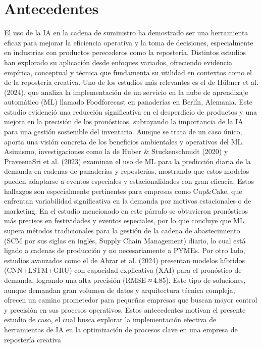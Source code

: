 \documentclass[12pt]{book}
\begin{document}
\chapter{Antecedentes}
El uso de la IA en la cadena de suministro ha demostrado ser una herramienta eficaz para mejorar la eficiencia operativa y la toma de decisiones, especialmente en industrias con productos perecederos como la repostería. Distintos estudios han explorado su aplicación desde enfoques variados, ofreciendo evidencia empírica, conceptual y técnica que fundamenta su utilidad en contextos como el de la repostería creativa.
Uno de los estudios más relevantes es el de Hübner et al. (2024), que analiza la implementación de un servicio en la nube de aprendizaje automático (ML) llamado Foodforecast en panaderías en Berlín, Alemania. 
Este estudio evidenció una reducción significativa en el desperdicio de productos y una mejora en la precisión de los pronósticos, subrayando la importancia de la IA para una gestión sostenible del inventario. Aunque se trata de un caso único, aporta una visión concreta de los beneficios ambientales y operativos del ML.
Asimismo, investigaciones como la de Huber & Stuckenschmidt (2020) y PraveenaSri et al. (2023) examinan el uso de ML para la predicción diaria de la demanda en cadenas de panaderías y reposterías, mostrando que estos modelos pueden adaptarse a eventos especiales y estacionalidades con gran eficacia. Estos hallazgos son especialmente pertinentes para empresas como Cup&Cake, que enfrentan variabilidad significativa en la demanda por motivos estacionales o de marketing. En el estudio mencionado en este párrafo se obtuvieron pronósticos más precisos en festividades y eventos especiales, por lo que concluye que ML supera métodos tradicionales para la gestión de la cadena de abastecimiento (SCM por sus siglas en inglés, Supply Chain Management) diario, lo cual está ligado a cadenas de producción y no necesariamente a PYMEs.     
Por otro lado, estudios avanzados como el de Abrar et al. (2024) presentan modelos híbridos (CNN+LSTM+GRU) con capacidad explicativa (XAI) para el pronóstico de demanda, logrando una alta precisión (RMSE ≈ 4.85). Este tipo de soluciones, aunque demandan gran volumen de datos y arquitectura técnica compleja, ofrecen un camino prometedor para pequeñas empresas que buscan mayor control y precisión en sus procesos operativos.
Estos antecedentes motivan el presente estudio de caso, el cual busca explorar la implementación efectiva de herramientas de IA en la optimización de procesos clave en una empresa de repostería creativa
\end{document}
